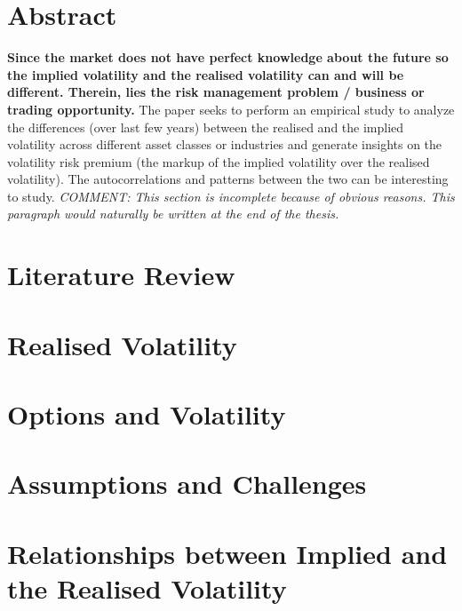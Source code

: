 \documentclass{article}[16pt]
\begin{document}
\onehalfspacing


\tableofcontents

\newpage
\section{Abstract}

\textbf{Since the market does not have perfect knowledge about the future so the implied volatility and the realised volatility can and will be different. Therein, lies the risk management problem / business or trading opportunity.}
The paper seeks to perform an empirical study to analyze the differences (over last few years) between the realised and the implied volatility across different asset classes or industries and generate insights on the volatility risk premium (the markup of the implied volatility over the realised volatility). The autocorrelations and patterns between the two can be interesting to study. \textit{COMMENT: This section is incomplete because of obvious reasons. This paragraph would naturally be written at the end of the thesis.}

\section[Literature Review]{Literature Review}



\section[Realised Volatility]{Realised Volatility}


\section[Option Markets]{Options and Volatility}


\section[Assumptions and Challenges]{Assumptions and Challenges}


\section[The Implied and the Realised Volatility]{Relationships between Implied and the Realised Volatility}

\end{document}

